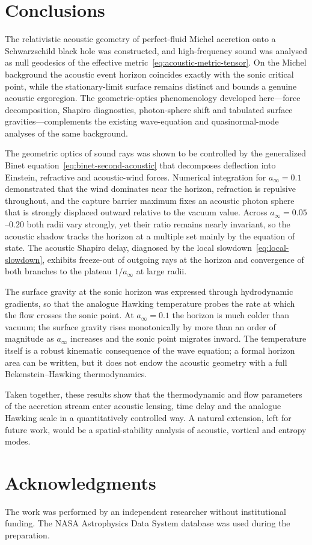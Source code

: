 \documentclass[12pt,a4paper,preprint]{elsarticle}
\begin{document}
    \section{Conclusions}\label{sec:conclusions}
        The relativistic acoustic geometry of perfect-fluid Michel accretion onto a Schwarzschild black hole was constructed, and high-frequency sound was analysed as null geodesics of the effective metric~\eqref{eq:acoustic-metric-tensor}. On the Michel background the acoustic event horizon coincides exactly with the sonic critical point, while the stationary-limit surface remains distinct and bounds a genuine acoustic ergoregion. The geometric-optics phenomenology developed here---force decomposition, Shapiro diagnostics, photon-sphere shift and tabulated surface gravities---complements the existing wave-equation and quasinormal-mode analyses of the same background.

        The geometric optics of sound rays was shown to be controlled by the generalized Binet equation~\eqref{eq:binet-second-acoustic} that decomposes deflection into Einstein, refractive and acoustic-wind forces. Numerical integration for $a_{\infty}=0.1$ demonstrated that the wind dominates near the horizon, refraction is repulsive throughout, and the capture barrier maximum fixes an acoustic photon sphere that is strongly displaced outward relative to the vacuum value. Across $a_{\infty}=0.05$--$0.20$ both radii vary strongly, yet their ratio remains nearly invariant, so the acoustic shadow tracks the horizon at a multiple set mainly by the equation of state. The acoustic Shapiro delay, diagnosed by the local slowdown~\eqref{eq:local-slowdown}, exhibits freeze-out of outgoing rays at the horizon and convergence of both branches to the plateau $1/a_{\infty}$ at large radii.

        The surface gravity at the sonic horizon was expressed through hydrodynamic gradients, so that the analogue Hawking temperature probes the rate at which the flow crosses the sonic point. At $a_{\infty}=0.1$ the horizon is much colder than vacuum; the surface gravity rises monotonically by more than an order of magnitude as $a_{\infty}$ increases and the sonic point migrates inward. The temperature itself is a robust kinematic consequence of the wave equation; a formal horizon area can be written, but it does not endow the acoustic geometry with a full Bekenstein--Hawking thermodynamics.

        Taken together, these results show that the thermodynamic and flow parameters of the accretion stream enter acoustic lensing, time delay and the analogue Hawking scale in a quantitatively controlled way. A natural extension, left for future work, would be a spatial-stability analysis of acoustic, vortical and entropy modes.

    \section*{Acknowledgments}
        The work was performed by an independent researcher without institutional funding. The NASA Astrophysics Data System database was used during the preparation.



\end{document}
